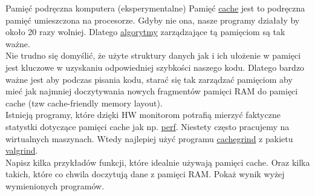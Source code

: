 \begin{exercise}{Pamięć podręczna komputera (eksperymentalne)}{}
Pamięć \href{https://www.geeksforgeeks.org/cache-memory-in-computer-organization/}{cache} jest to podręczna pamięć umieszczona na procesorze. Gdyby nie ona, nasze programy działały by około 20 razy wolniej. Dlatego \href{https://en.wikipedia.org/wiki/Cache_replacement_policies}{algorytmy} zarządzające tą pamięciom są tak ważne. \\

Nie trudno się domyślić, że użyte struktury danych jak i ich ułożenie w pamięci jest kluczowe w uzyskaniu odpowiedniej szybkości naszego kodu. Dlatego bardzo ważne jest aby podczas pisania kodu, starać się tak zarządzać pamięciom aby mieć jak najmniej doczytywania nowych fragmentów pamięci RAM do pamięci cache (tzw cache-friendly memory layout). \\

Istnieją programy, które dzięki HW monitorom potrafią mierzyć faktyczne statystki dotyczące pamięci cache jak np. \href{http://www.brendangregg.com/perf.html}{perf}. Niestety często pracujemy na wirtualnych maszynach. Wtedy najlepiej użyć programu \href{https://valgrind.org/docs/manual/cg-manual.html}{cachegrind} z pakietu \href{https://valgrind.org/}{valgrind}. \\

Napisz kilka przykładów funkcji, które idealnie używają pamięci cache. Oraz kilka takich, które co chwila doczytują dane z pamięci RAM. Pokaż wynik wyżej wymienionych programów.
\end{exercise}

\clearpage

